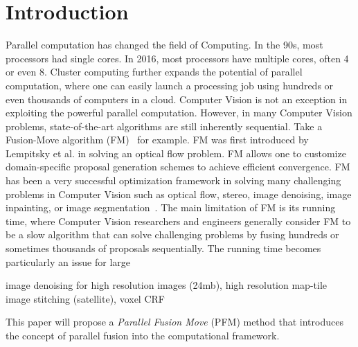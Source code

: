 \section{Introduction}
Parallel computation has changed the field of Computing.  In the 90s,
most processors had single cores. In 2016, most processors have multiple
cores, often 4 or even 8. Cluster computing further expands the
potential of parallel computation, where one can easily launch a
processing job using hundreds or even thousands of computers in a
cloud. Computer Vision is not an exception in exploiting the powerful
parallel computation. However, in many Computer Vision problems,
state-of-the-art algorithms are still inherently sequential. Take a
Fusion-Move algorithm (FM)~\cite{viktor,second_order_stereo,else} for
example. FM was first introduced by Lempitsky et al. in solving an
optical flow problem. FM allows one to customize domain-specific
proposal generation schemes to achieve efficient convergence. FM has
been a very successful optimization framework in solving many
challenging problems in Computer Vision such as optical flow, stereo,
image denoising, image inpainting, or image
segmentation~\cite{fusion_moves_for_markov_random_field_optimization}. The
main limitation of FM is its running time, where Computer Vision
researchers and engineers generally consider FM to be a slow algorithm
that can solve challenging problems by fusing hundreds or sometimes
thousands of proposals sequentially.
%
The running time becomes particularly an issue for large

image denoising for high resolution images (24mb), high resolution
map-tile image stitching (satellite), voxel CRF~\cite{pollefeys}


%
This paper will propose a {\it Parallel Fusion Move} (PFM) method that
introduces the concept of parallel fusion into the computational
framework.


